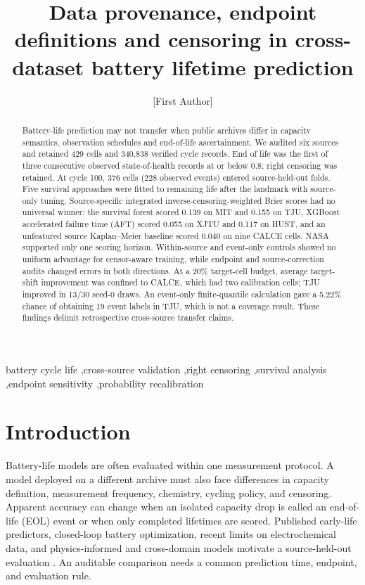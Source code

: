 \documentclass[preprint,12pt]{elsarticle}
\begin{document}
\begin{frontmatter}
\title{Data provenance, endpoint definitions and censoring in cross-dataset battery lifetime prediction}
\author[aff1]{[First Author]}

\begin{abstract}
Battery-life prediction may not transfer when public archives differ in capacity semantics, observation schedules and end-of-life ascertainment. We audited six sources and retained 429 cells and 340,838 verified cycle records. End of life was the first of three consecutive observed state-of-health records at or below 0.8; right censoring was retained. At cycle 100, 376 cells (228 observed events) entered source-held-out folds. Five survival approaches were fitted to remaining life after the landmark with source-only tuning. Source-specific integrated inverse-censoring-weighted Brier scores had no universal winner: the survival forest scored 0.139 on MIT and 0.155 on TJU, XGBoost accelerated failure time (AFT) scored 0.055 on XJTU and 0.117 on HUST, and an unfeatured source Kaplan--Meier baseline scored 0.040 on nine CALCE cells. NASA supported only one scoring horizon. Within-source and event-only controls showed no uniform advantage for censor-aware training, while endpoint and source-correction audits changed errors in both directions. At a 20\% target-cell budget, average target-shift improvement was confined to CALCE, which had two calibration cells; TJU improved in 13/30 seed-0 draws. An event-only finite-quantile calculation gave a 5.22\% chance of obtaining 19 event labels in TJU, which is not a coverage result. These findings delimit retrospective cross-source transfer claims.
\end{abstract}
\begin{keyword}
battery cycle life \sep cross-source validation \sep right censoring \sep survival analysis \sep endpoint sensitivity \sep probability recalibration
\end{keyword}
\end{frontmatter}

\section{Introduction}
Battery-life models are often evaluated within one measurement protocol. A model deployed on a different archive must also face differences in capacity definition, measurement frequency, chemistry, cycling policy, and censoring. Apparent accuracy can change when an isolated capacity drop is called an end-of-life (EOL) event or when only completed lifetimes are scored. Published early-life predictors, closed-loop battery optimization, recent limits on electrochemical data, and physics-informed and cross-domain models motivate a source-held-out evaluation \citep{severson2019,attia2020,attia2026,wang2024pin,tang2024ae,ledeng2026,zhu2026lake}. An auditable comparison needs a common prediction time, endpoint, and evaluation rule.
\end{document}
